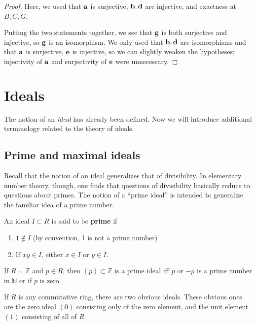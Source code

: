 \begin{proof}
Here, we used that $\mathbf{a}$ is surjective, $\mathbf{b}, \mathbf{d}$ are injective, and exactness at
$B, C, G$.

Putting the two statements together, we see that $\mathbf{g}$ is both surjective and
injective, so $\mathbf{g}$ is an isomorphism. We only used that $\mathbf{b}, \mathbf{d}$ are
isomorphisms and that $\mathbf{a}$ is surjective, $\mathbf{e}$ is injective, so we can slightly
weaken the hypotheses; injectivity of $\mathbf{a}$ and surjectivity of $\mathbf{e}$ were
unnecessary.

\end{proof} 


\section{Ideals}

The notion of an \emph{ideal} has already been defined. Now we will introduce additional terminology related to the theory of ideals.

\subsection{Prime and maximal ideals}

Recall that the notion of an ideal generalizes that of divisibility. In
elementary number theory, though, one finds that questions of divisibility
basically reduce to questions about primes. 
The notion of a ``prime ideal'' is intended to generalize the familiar idea of a prime
number.

\begin{definition} 
An ideal $I \subset R$ is said to be \textbf{prime} if
\begin{enumerate}[\textbf{P} 1]
\item  $1 \notin I$ (by convention, 1 is not a prime number)
\item If $xy \in I$, either $x \in I$ or $y \in I$.
\end{enumerate}
\end{definition} 

\begin{example}
\label{integerprimes}
If $R = \mathbb{Z}$ and $p \in R$, then $(p) \subset \mathbb{Z}$ is a prime ideal iff $p$ or $-p$ is a
prime number in $\mathbb{N}$ or if $p$ is zero. 
\end{example} 



If $R$ is any commutative ring, there are two obvious ideals. These obvious
ones are the zero ideal $(0)$
consisting only of the zero element, and the unit element $(1)$ consisting of all of
$R$.


